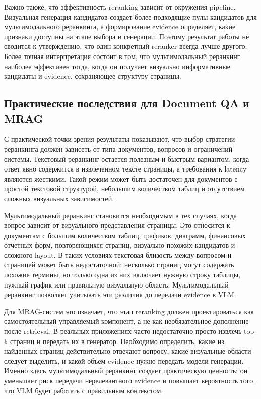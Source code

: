 \documentclass[conference]{IEEEtran}
\begin{document}
Важно также, что эффективность reranking зависит от окружения pipeline. Визуальная генерация кандидатов создает более подходящие пулы кандидатов для мультимодального реранкинга, а формирование evidence определяет, какие признаки доступны на этапе выбора и генерации. Поэтому результат работы не сводится к утверждению, что один конкретный reranker всегда лучше другого. Более точная интерпретация состоит в том, что мультимодальный реранкинг наиболее эффективен тогда, когда он получает визуально информативные кандидаты и evidence, сохраняющее структуру страницы.

\subsection{Практические последствия для Document QA и MRAG}

С практической точки зрения результаты показывают, что выбор стратегии реранкинга должен зависеть от типа документов, вопросов и ограничений системы. Текстовый реранкинг остается полезным и быстрым вариантом, когда ответ явно содержится в извлеченном тексте страницы, а требования к latency являются жесткими. Такой режим может быть достаточен для документов с простой текстовой структурой, небольшим количеством таблиц и отсутствием сложных визуальных зависимостей.

Мультимодальный реранкинг становится необходимым в тех случаях, когда вопрос зависит от визуального представления страницы. Это относится к документам с большим количеством таблиц, графиков, диаграмм, финансовых отчетных форм, повторяющихся страниц, визуально похожих кандидатов и сложного layout. В таких условиях текстовая близость между вопросом и страницей может быть недостаточной: несколько страниц могут содержать похожие термины, но только одна из них включает нужную строку таблицы, нужный график или правильную визуальную область. Мультимодальный реранкинг позволяет учитывать эти различия до передачи evidence в VLM.

Для MRAG-систем это означает, что этап reranking должен проектироваться как самостоятельный управляемый компонент, а не как необязательное дополнение после retrieval. В реальных приложениях часто недостаточно просто извлечь top-k страниц и передать их в генератор. Необходимо определить, какие из найденных страниц действительно отвечают вопросу, какие визуальные области следует выделить, и какой объем evidence нужно передать модели генерации. Именно здесь мультимодальный реранкинг создает практическую ценность: он уменьшает риск передачи нерелевантного evidence и повышает вероятность того, что VLM будет работать с правильным контекстом.
\end{document}
